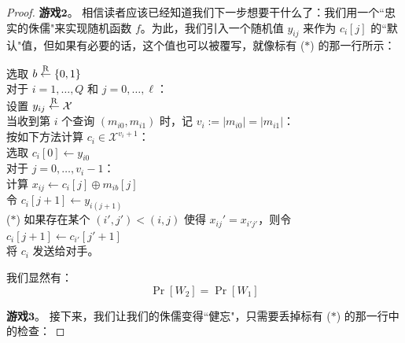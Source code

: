 \begin{proof}
\noindent\textbf{游戏$\mathbf{2}$}。
相信读者应该已经知道我们下一步想要干什么了：我们用一个``忠实的侏儒"来实现随机函数 $f$。为此，我们引入一个随机值 $y_{ij}$ 来作为 $c_i[j]$ 的``默认"值，但如果有必要的话，这个值也可以被覆写，就像标有 ($*$) 的那一行所示：

\vspace{5pt}

\hspace*{5pt} 选取 $b\overset{\rm R}\leftarrow\{0,1\}$\\
\hspace*{26pt} 对于 $i=1,\dots,Q$ 和 $j=0,\dots,\ell$：\\
\hspace*{50pt} 设置 $y_{ij}\overset{\rm R}\leftarrow\mathcal{X}$\\
\hspace*{26pt} 当收到第 $i$ 个查询 $(m_{i0},m_{i1})$ 时，记 $v_i:=|m_{i0}|=|m_{i1}|$：\\
\hspace*{50pt} 按如下方法计算 $c_i\in\mathcal{X}^{v_i+1}$：\\
\hspace*{75pt} 选取 $c_i[0]\leftarrow y_{i0}$\\
\hspace*{75pt} 对于 $j=0,\dots,v_i-1$：\\
\hspace*{100pt} 计算 $x_{ij}\leftarrow c_i[j]\oplus m_{ib}[j]$\\
\hspace*{100pt} 令 $c_i[j+1]\leftarrow y_{i(j+1)}$\\
\hspace*{3pt} ($*$)
\hspace*{76.5pt} 如果存在某个 $(i',j')<(i,j)$ 使得 $x_{ij}'=x_{i'j'}$，则令 $c_i[j+1]\leftarrow c_{i'}[j'+1]$\\
\hspace*{50pt} 将 $c_i$ 发送给对手。

\vspace{5pt}

我们显然有：
\begin{equation}\label{eq:5-26}
\Pr[W_2]=\Pr[W_1]
\end{equation}

\noindent\textbf{游戏$\mathbf{3}$}。
接下来，我们让我们的侏儒变得``健忘"，只需要丢掉标有 ($*$) 的那一行中的检查：

\vspace{5pt}


\end{proof}
